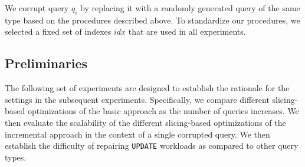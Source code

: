  We corrupt query $q_i$ by replacing it with a randomly
generated query of the same type based on the procedures described above.
To standardize our procedures, we selected a fixed set of indexes $idx$
that are used in all experiments.  







\subsection{Preliminaries}
The following set of experiments are designed to establish the rationale for 
the settings in the subsequent experiments.  
Specifically, we compare different slicing-based optimizations of the basic approach
as the number of queries increases.  
We then evaluate the scalability of the different slicing-based optimizations of the 
incremental approach in the context of a single
corrupted query. We then establish the difficulty of repairing \texttt{UPDATE} 
workloads as compared to other query types. 

